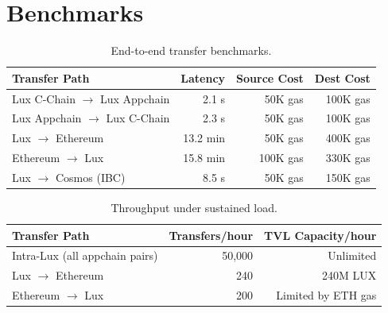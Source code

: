\section{Benchmarks}
\label{sec:benchmarks}

\begin{table}[H]
\centering
\caption{End-to-end transfer benchmarks.}
\label{tab:benchmarks}
\begin{tabular}{lrrr}
\toprule
\textbf{Transfer Path} & \textbf{Latency} & \textbf{Source Cost} & \textbf{Dest Cost} \\
\midrule
Lux C-Chain $\to$ Lux Appchain & 2.1 s & 50K gas & 100K gas \\
Lux Appchain $\to$ Lux C-Chain & 2.3 s & 50K gas & 100K gas \\
Lux $\to$ Ethereum & 13.2 min & 50K gas & 400K gas \\
Ethereum $\to$ Lux & 15.8 min & 100K gas & 330K gas \\
Lux $\to$ Cosmos (IBC) & 8.5 s & 50K gas & 150K gas \\
\bottomrule
\end{tabular}
\end{table}

\begin{table}[H]
\centering
\caption{Throughput under sustained load.}
\label{tab:throughput}
\begin{tabular}{lrr}
\toprule
\textbf{Transfer Path} & \textbf{Transfers/hour} & \textbf{TVL Capacity/hour} \\
\midrule
Intra-Lux (all appchain pairs) & 50,000 & Unlimited \\
Lux $\to$ Ethereum & 240 & 240M LUX \\
Ethereum $\to$ Lux & 200 & Limited by ETH gas \\
\bottomrule
\end{tabular}
\end{table}

